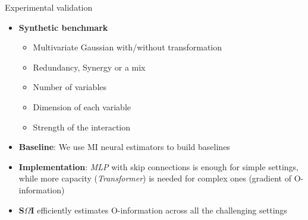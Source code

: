 \documentclass{beamer}
\begin{document}
\begin{frame}{Experimental validation}
\begin{itemize}
    \item \textbf{Synthetic benchmark}
    \begin{itemize}
        \item Multivariate Gaussian with/without transformation
        \item Redundancy, Synergy or a mix
        \item Number of variables 
        \item Dimension of each variable
        \item Strength of the interaction

    \end{itemize}
    \item \textbf{Baseline}: We use MI neural estimators to build baselines
    \item \textbf{Implementation}: \textit{MLP} with skip connections is enough for simple settings, while more capacity (\textit{Transformer}) is needed for complex ones (gradient of O-information) 
    \item \textbf{S$\Omega$I} efficiently estimates O-information across all the challenging settings 
    
\end{itemize}
\end{frame}



    
            
\end{document}
